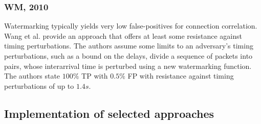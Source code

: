 \documentclass[runningheads,11pt]{llncs}\usepackage[]{graphicx}\usepackage[]{color}
\begin{document}
\subsubsection{WM, 2010}
Watermarking typically yields very low false-positives for connection correlation. %
Wang et al. \cite{wang2010robust} provide an approach that offers at least some resistance against timing perturbations. The authors assume some limits to an adversary's timing perturbations, such as a bound on the delays, divide a sequence of packets into pairs, whose interarrival time is perturbed using a new watermarking function. %
The authors state $100\%$ TP with $0.5\%$ FP with resistance against timing perturbations of up to $1.4s$.






%
%
%
%
%

\subsection{Implementation of selected approaches}
\end{document}

